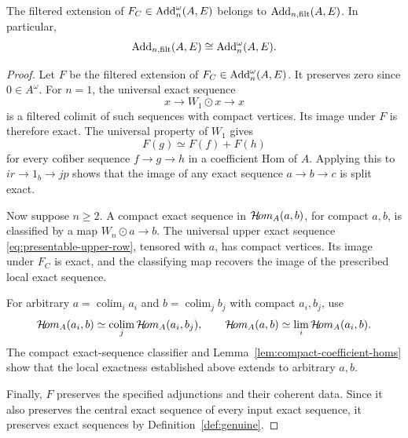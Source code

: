 \begin{proposition}\label{prop:global-additive-extension}
The filtered extension of $F_C\in\operatorname{Add}_n^\omega(A,E)$ belongs to
$\operatorname{Add}_{n,\mathrm{filt}}(A,E)$.
In particular, 
\[
\operatorname{Add}_{n,\mathrm{filt}}(A,E)\cong \operatorname{Add}_n^\omega(A,E).
\]
\end{proposition}

\begin{proof}
Let $F$ be the filtered extension of
$F_C\in\operatorname{Add}_n^\omega(A,E)$.
It preserves zero since $0\in A^\omega$.
For $n=1$, the universal exact sequence
\[
 x\longrightarrow W_1\odot x\longrightarrow x
\]
is a filtered colimit of such sequences with
compact vertices. Its image under $F$ is therefore
exact. The universal property of $W_1$ gives
\[
 F(g)\simeq F(f)+F(h)
\]
for every cofiber sequence $f\to g\to h$
in a coefficient Hom of $A$.
Applying this to $ir\to1_b\to jp$ shows that
the image of any exact sequence
$a\to b\to c$ is split exact.

Now suppose $n\geq2$.
A compact exact sequence in
$\mathcal{H}\!om_A(a,b)$, for compact $a,b$,
is classified by a map $W_n\odot a\to b$.
The universal upper exact sequence
\eqref{eq:presentable-upper-row}, tensored
with $a$, has compact vertices.
Its image under $F_C$ is exact, and
the classifying map recovers the image
of the prescribed local exact sequence.

For arbitrary $a=\operatorname*{colim}_ia_i$
and $b=\operatorname*{colim}_jb_j$ with
compact $a_i,b_j$, use
\[
 \mathcal{H}\!om_A(a_i,b)
 \simeq\operatorname*{colim}_j\mathcal{H}\!om_A(a_i,b_j),
 \qquad
 \mathcal{H}\!om_A(a,b)
 \simeq\lim_i\mathcal{H}\!om_A(a_i,b).
\]
The compact exact-sequence classifier and
Lemma~\ref{lem:compact-coefficient-homs}
show that the local exactness established
above extends to arbitrary $a,b$.

Finally, $F$ preserves the specified adjunctions
and their coherent data. Since it also preserves
the central exact sequence of every input exact
sequence, it preserves exact sequences by
Definition~\ref{def:genuine}.
\end{proof}